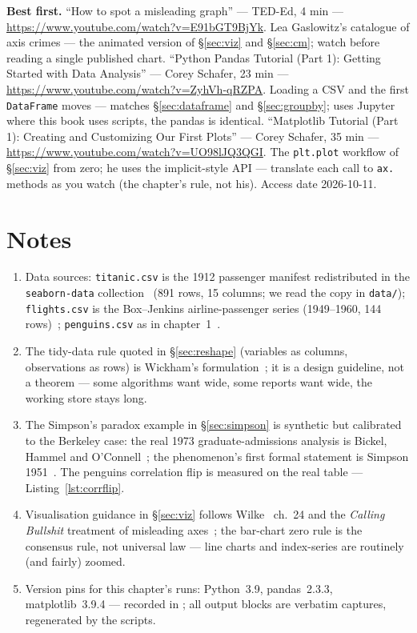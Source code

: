\begin{rulebox}
\smallskip\noindent\textbf{Best first.}
``How to spot a misleading graph'' --- TED-Ed, 4 min ---
\url{https://www.youtube.com/watch?v=E91bGT9BjYk}. Lea Gaslowitz's catalogue
of axis crimes --- the animated version of \S\ref{sec:viz} and
\S\ref{sec:cm}; watch before reading a single published chart.
\smallskip\noindent
``Python Pandas Tutorial (Part 1): Getting Started with Data Analysis'' ---
Corey Schafer, 23 min ---
\url{https://www.youtube.com/watch?v=ZyhVh-qRZPA}. Loading a CSV and the
first \texttt{DataFrame} moves --- matches \S\ref{sec:dataframe} and
\S\ref{sec:groupby}; uses Jupyter where this book uses scripts, the
pandas is identical.
\smallskip\noindent
``Matplotlib Tutorial (Part 1): Creating and Customizing Our First Plots''
--- Corey Schafer, 35 min ---
\url{https://www.youtube.com/watch?v=UO98lJQ3QGI}. The
\texttt{plt.plot} workflow of \S\ref{sec:viz} from zero; he uses the
implicit-style API --- translate each call to \texttt{ax.} methods as you
watch (the chapter's rule, not his).
Access date 2026-10-11.
\end{rulebox}

\section*{Notes}
\begin{enumerate}
\item Data sources: \texttt{titanic.csv} is the 1912 passenger manifest
  redistributed in the \texttt{seaborn-data} collection~\cite{seaborn-data}
  (891 rows, 15 columns; we read the copy in \texttt{data/});
  \texttt{flights.csv} is the Box--Jenkins airline-passenger series
  (1949--1960, 144 rows)~\cite{seaborn-data}; \texttt{penguins.csv} as in
  chapter~1~\cite{gorman2014,seaborn-data}.
\item The tidy-data rule quoted in \S\ref{sec:reshape} (variables as
  columns, observations as rows) is Wickham's formulation~\cite{wickham2014};
  it is a design guideline, not a theorem --- some algorithms want wide, some
  reports want wide, the working store stays long.
\item The Simpson's paradox example in \S\ref{sec:simpson} is synthetic but
  calibrated to the Berkeley case: the real 1973 graduate-admissions
  analysis is Bickel, Hammel and O'Connell~\cite{bickel1975}; the
  phenomenon's first formal statement is Simpson 1951~\cite{simpson1951}.
  The penguins correlation flip is measured on the real table ---
  Listing~\ref{lst:corrflip}.
\item Visualisation guidance in \S\ref{sec:viz} follows
  Wilke~\cite{wilke2019} ch.~24 and the \emph{Calling Bullshit} treatment of
  misleading axes~\cite{callingbullshit}; the bar-chart zero rule is the
  consensus rule, not universal law --- line charts and index-series are
  routinely (and fairly) zoomed.
\item Version pins for this chapter's runs: Python~3.9, pandas~2.3.3,
  matplotlib~3.9.4 --- recorded in ; all output blocks
  are verbatim captures, regenerated by the scripts.
\end{enumerate}

